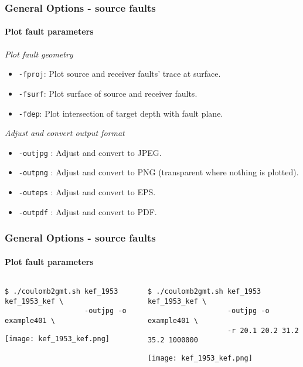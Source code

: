 \begin{frame}
  \frametitle{General Options - source faults}
  \framesubtitle{Plot fault parameters}
  \label{fr4:hist_pics}

\emph{Plot fault geometry}

\begin{scriptsize}
\begin{itemize}
\item
  \texttt{-fproj}: Plot source and receiver faults' trace at surface.
\item
  \texttt{-fsurf}: Plot surface of source and receiver faults.
\item
  \texttt{-fdep}: Plot intersection of target depth with fault plane.
\end{itemize}
\end{scriptsize}

\emph{Adjust and convert output format}
\begin{scriptsize}
\begin{itemize}
\item
  \texttt{-outjpg} : Adjust and convert to JPEG.
\item
  \texttt{-outpng} : Adjust and convert to PNG (transparent where
  nothing is plotted).
\item
  \texttt{-outeps} : Adjust and convert to EPS.
\item
  \texttt{-outpdf} : Adjust and convert to PDF.
\end{itemize}
\end{scriptsize}
\end{frame}
\note{}

\begin{frame}[t,fragile]
  \frametitle{General Options - source faults}
  \framesubtitle{Plot fault parameters}
  \label{fr4:hist_pics}
\begin{columns}[t]
  \begin{column}{.5\textwidth}
\begin{scriptsize}
\begin{verbatim}
$ ./coulomb2gmt.sh kef_1953 kef_1953_kef \
                   -outjpg -o example401 \
\end{verbatim}
\end{scriptsize}
\centering
\texttt{[image: kef\_1953\_kef.png]}
  \end{column}
  \begin{column}{.5\textwidth}
  \begin{scriptsize}
\begin{verbatim}
$ ./coulomb2gmt.sh kef_1953 kef_1953_kef \
                   -outjpg -o example401 \
                   -r 20.1 20.2 31.2 35.2 1000000
\end{verbatim}
\end{scriptsize}
\centering
  \texttt{[image: kef\_1953\_kef.png]}
  \end{column}
\end{columns}

\end{frame}
\note{}

